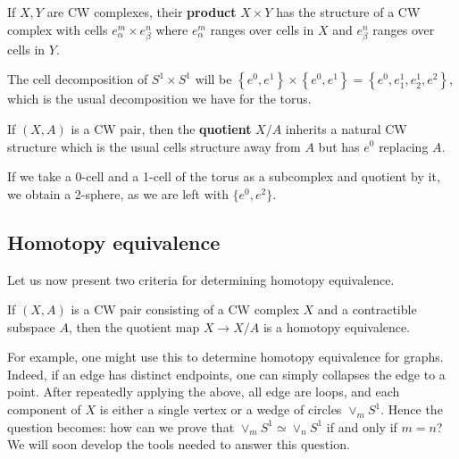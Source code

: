\documentclass{../mathnotes}
\begin{document}
\begin{defn}
    If $X,Y$ are CW complexes, their \textbf{product} $X\times Y$ has the structure of a CW complex with cells $e^m_\alpha\times e^n_\beta$
    where $e^m_\alpha$ ranges over cells in $X$ and $e^n_\beta$ ranges over cells in $Y$.
\end{defn}

\begin{exmp}
    The cell decomposition of $S^1\times S^1$ will be $\left\{ e^0,e^1 \right\}\times \left\{ e^0,e^1 \right\}=\left\{ e^0,e_1^1,e_2^1,e^2 \right\}$,
    which is the usual decomposition we have for the torus.
\end{exmp}

\begin{defn}
    If $(X,A)$ is a CW pair, then the \textbf{quotient} $X/A$ inherits a natural CW structure which is the usual cells structure away from $A$
    but has $e^0$ replacing $A$.
\end{defn}

\begin{exmp}
    If we take a 0-cell and a 1-cell of the torus as a subcomplex and quotient by it, we obtain a 2-sphere, as we are left with
    $\{e^0,e^2\}$.
\end{exmp}

\subsection{Homotopy equivalence}

Let us now present two criteria for determining homotopy equivalence.

\begin{lem}
    If $(X,A)$ is a CW pair consisting of a CW complex $X$ and a contractible subspace $A$, then the quotient map $X\to X/A$ is a homotopy
    equivalence.
\end{lem}

\begin{exmp}
    For example, one might use this to determine homotopy equivalence for graphs. Indeed, if an edge has distinct endpoints, one can simply collapses the edge
    to a point. After repeatedly applying the above, all edge are loops, and each component of $X$ is either a single vertex or a wedge of circles $\vee_m S^1$.
    Hence the question becomes: how can we prove that $\vee_m S^1\simeq\vee_n S^1$ if and only if $m=n$? We will soon develop the tools needed to answer this question.
\end{exmp}
\end{document}
